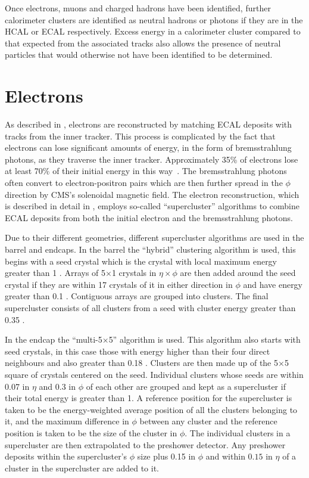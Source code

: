 Once electrons, muons and charged hadrons have been identified, further calorimeter clusters are identified as neutral hadrons or photons if they are in the \ac{HCAL} or \ac{ECAL} respectively. Excess energy in a calorimeter cluster compared to that expected from the associated tracks also allows the presence of neutral particles that would otherwise not have been identified to be determined.

\section{Electrons}
\label{sec:electrons}
As described in , electrons are reconstructed by matching \ac{ECAL} deposits with tracks from the inner tracker. This process is complicated by the fact that electrons can lose significant amounts of energy, in the form of bremsstrahlung photons, as they traverse the inner tracker. Approximately 35\% of electrons lose at least 70\% of their initial energy in this way~\cite{Baffioni:2006cd}. The bremsstrahlung photons often convert to electron-positron pairs which are then further spread in the $\phi$ direction by CMS's solenoidal magnetic field. The electron reconstruction, which is described in detail in , employs so-called ``supercluster'' algorithms to combine \ac{ECAL} deposits from both the initial electron and the bremsstrahlung photons.

Due to their different geometries, different supercluster algorithms are used in the barrel and endcaps. In the barrel the ``hybrid'' clustering algorithm is used, this begins with a seed crystal which is the crystal with local maximum energy greater than 1 \GeV. Arrays of 5$\times$1 crystals in $\eta\times\phi$ are then added around the seed crystal if they are within 17 crystals of it in either direction in $\phi$ and have energy greater than 0.1 \GeV. Contiguous arrays are grouped into clusters. The final supercluster consists of all clusters from a seed with cluster energy greater than 0.35 \GeV.

In the endcap the ``multi-5$\times$5'' algorithm is used. This algorithm also starts with seed crystals, in this case those with energy higher than their four direct neighbours and also greater than 0.18 \GeV. Clusters are then made up of the 5$\times$5 square of crystals centered on the seed. Individual clusters whose seeds are within 0.07 in $\eta$ and 0.3 in $\phi$ of each other are grouped and kept as a supercluster if their total energy is greater than 1\GeV. A reference position for the supercluster is taken to be the energy-weighted average position of all the clusters belonging to it, and the maximum difference in $\phi$ between any cluster and the reference position is taken to be the size of the cluster in $\phi$. The individual clusters in a supercluster are then extrapolated to the preshower detector. Any preshower deposits within the supercluster's $\phi$ size plus 0.15 in $\phi$ and within $0.15$ in $\eta$ of a cluster in the supercluster are added to it.


